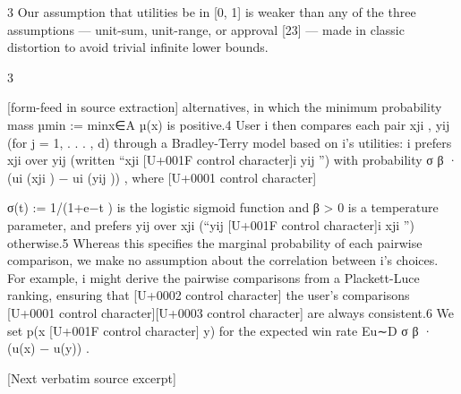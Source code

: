 \documentclass[10pt]{article}
\begin{document}
\begin{ReviewVerbatim}
    3
     Our assumption that utilities be in [0, 1] is weaker than any of the three assumptions — unit-sum, unit-range,
or approval [23] — made in classic distortion to avoid trivial infinite lower bounds.


                                                           3

[form-feed in source extraction]
alternatives, in which the minimum probability mass µmin := minx∈A µ(x) is positive.4 User i
then compares each pair {xji , yij } (for j = 1, . . . , d) through a Bradley-Terry model based on i’s
utilities: i prefers xji over yij (written “xji [U+001F control character]i yij ”) with probability σ β · (ui (xji ) − ui (yij )) , where
                                                                                                        [U+0001 control character]

σ(t) := 1/(1+e−t ) is the logistic sigmoid function and β > 0 is a temperature parameter, and prefers
yij over xji (“yij [U+001F control character]i xji ”) otherwise.5 Whereas this specifies the marginal probability of each pairwise
comparison, we make no assumption about the correlation between i’s choices. For example, i might
derive the pairwise comparisons from a Plackett-Luce ranking, ensuring that      [U+0002 control character] the user’s comparisons  [U+0001 control character][U+0003 control character]
are always consistent.6 We set p(x [U+001F control character] y) for the expected win rate Eu∼D σ β · (u(x) − u(y)) .

[Next verbatim source excerpt]


\end{ReviewVerbatim}
\end{document}
